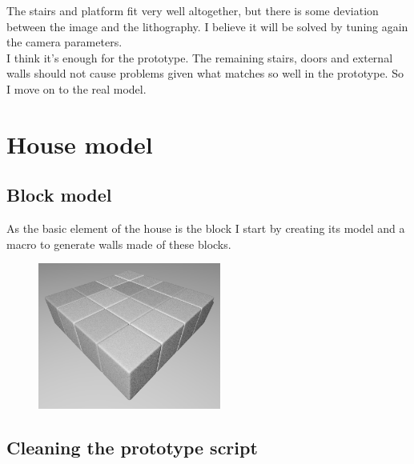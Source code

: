 \documentclass[12pt, a4paper]{article}
\begin{document}
The stairs and platform fit very well altogether, but there is some deviation between the image and the lithography. I believe it will be solved by tuning again the camera parameters.\\

I think it's enough for the prototype. The remaining stairs, doors and external walls should not cause problems given what matches so well in the prototype. So I move on to the real model.\\

\section{House model}

\subsection{Block model}

As the basic element of the house is the block I start by creating its model and a macro to generate walls made of these blocks.\\

\begin{scriptsize}
\begin{ttfamily}

\end{ttfamily}
\end{scriptsize}

\begin{center}
\begin{figure}[H]
\centering
\includegraphics[width=6cm]{./block_1.png}\\
\end{figure}
\end{center}

\subsection{Cleaning the prototype script}
\end{document}
